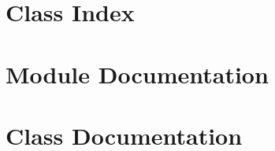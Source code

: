 \documentclass[twoside]{book}
\newcommand{\+}{\discretionary{\mbox{\scriptsize$\hookleftarrow$}}{}{}}
\newcommand{\clearemptydoublepage}{%
  \newpage{\pagestyle{empty}\cleardoublepage}%
}
\begin{document}
\chapter{Class Index}

\chapter{Module Documentation}


















\chapter{Class Documentation}


























\backmatter
\newpage
{}
\clearemptydoublepage
{}
\printindex
\end{document}
